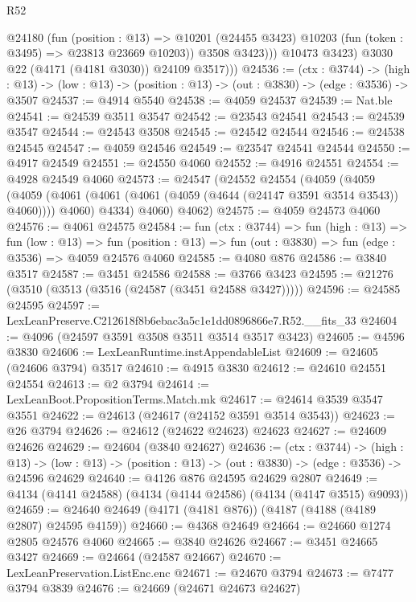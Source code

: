 \begin{lexlean}{R52}
\begin{coremodule}
                @24180
                  (fun (position : @13) =>
                  @10201 (@24455 @3423) @10203 (fun (token : @3495) => @23813 @23669 @10203))
                  @3508
                  @3423)))
            @10473
            @3423)
          @3030
          @22
          (@4171 (@4181 @3030))
          @24109
          @3517)))
@24536 := (ctx : @3744) ->
  (high : @13) -> (low : @13) -> (position : @13) -> (out : @3830) -> (edge : @3536) -> @3507
@24537 := @4914 @5540
@24538 := @4059 @24537
@24539 := Nat.ble
@24541 := @24539 @3511 @3547
@24542 := @23543 @24541
@24543 := @24539 @3547
@24544 := @24543 @3508
@24545 := @24542 @24544
@24546 := @24538 @24545
@24547 := @4059 @24546
@24549 := @23547 @24541 @24544
@24550 := @4917 @24549
@24551 := @24550 @4060
@24552 := @4916 @24551
@24554 := @4928 @24549 @4060
@24573 := @24547
    (@24552
      @24554
      (@4059
        (@4059
          (@4059 (@4061 (@4061 (@4061 (@4059 (@4644 (@24147 @3591 @3514 @3543)) @4060)))) @4060)
          @4334)
        @4060)
      @4062)
@24575 := @4059 @24573 @4060
@24576 := @4061 @24575
@24584 := fun (ctx : @3744) =>
  fun (high : @13) =>
  fun (low : @13) =>
  fun (position : @13) => fun (out : @3830) => fun (edge : @3536) => @4059 @24576 @4060
@24585 := @4080 @876
@24586 := @3840 @3517
@24587 := @3451 @24586
@24588 := @3766 @3423
@24595 := @21276 (@3510 (@3513 (@3516 (@24587 (@3451 @24588 @3427)))))
@24596 := @24585 @24595
@24597 := LexLeanPreserve.C212618f8b6ebac3a5c1e1dd0896866e7.R52.__fits_33
@24604 := @4096 (@24597 @3591 @3508 @3511 @3514 @3517 @3423)
@24605 := @4596 @3830
@24606 := LexLeanRuntime.instAppendableList
@24609 := @24605 (@24606 @3794) @3517
@24610 := @4915 @3830
@24612 := @24610 @24551 @24554
@24613 := @2 @3794
@24614 := LexLeanBoot.PropositionTerms.Match.mk
@24617 := @24614 @3539 @3547 @3551
@24622 := @24613 (@24617 (@24152 @3591 @3514 @3543))
@24623 := @26 @3794
@24626 := @24612 (@24622 @24623) @24623
@24627 := @24609 @24626
@24629 := @24604 (@3840 @24627)
@24636 := (ctx : @3744) ->
  (high : @13) ->
  (low : @13) -> (position : @13) -> (out : @3830) -> (edge : @3536) -> @24596 @24629
@24640 := @4126 @876 @24595 @24629 @2807
@24649 := @4134 (@4141 @24588) (@4134 (@4144 @24586) (@4134 (@4147 @3515) @9093))
@24659 := @24640 @24649 (@4171 (@4181 @876)) (@4187 (@4188 (@4189 @2807) @24595 @4159))
@24660 := @4368 @24649
@24664 := @24660 @1274 @2805 @24576 @4060
@24665 := @3840 @24626
@24667 := @3451 @24665 @3427
@24669 := @24664 (@24587 @24667)
@24670 := LexLeanPreservation.ListEnc.enc
@24671 := @24670 @3794
@24673 := @7477 @3794 @3839
@24676 := @24669 (@24671 @24673 @24627)

\end{coremodule}
\end{lexlean}
